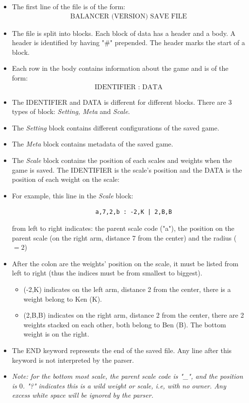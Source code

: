 \documentclass[12pt]{article}
\begin{document}
\begin{itemize}
  \item The first line of the file is of the form: 
    \begin{align*}
      \text{BALANCER (VERSION) SAVE FILE}
    \end{align*}
  \item The file is split into blocks. Each block of data has a header and a
    body. A header is identified by having "\#" prepended. The header marks the
    start of a block.
  \item Each row in the body contains information about the game and is of the
    form:
    \begin{align*}
      \text{IDENTIFIER : DATA}
    \end{align*}
    \item The IDENTIFIER and DATA is different for different blocks.  There are
      3 types of block: \textit{Setting, Meta} and \textit{Scale}.
  \item The \textit{Setting} block contains different configurations of the saved game.
  \item The \textit{Meta} block contains metadata of the saved game. 
  \item The \textit{Scale} block contains the position of each scales and weights when
    the game is saved. The IDENTIFIER is the scale's position and the DATA is
    the position of each weight on the scale:
  \item For example, this line in the \textit{Scale}  block:
    \begin{verbatim}
                        a,7,2,b : -2,K | 2,B,B
    \end{verbatim}
    from left to right indicates: the parent scale code ("a"), the position on
    the parent scale (on the right arm, distance 7 from the center) and the
    radius ($=2$) \item After the colon are the weights' position on the scale,
    it must be listed from left to right (thus the indices must be from smallest
    to biggest). 
    \begin{itemize}
      \item (-2,K) indicates on the left arm, distance 2 from the center, there
        is a weight belong to Ken (K).
      \item (2,B,B) indicates on the right arm, distance 2 from the center,
        there are 2 weights stacked on each other, both belong to Ben (B). The
        bottom weight is on the right.
    \end{itemize}
  \item The END keyword represents the end of the saved file. Any line after
    this keyword is not interpreted by the parser.
  \item \textit{Note: for the bottom most scale, the parent scale code is "\_",
    and the position is $0$. "?" indicates this is a wild weight or scale, i.e,
  with no owner. Any excess white space will be ignored by the parser.} 
\end{itemize}
\end{document}

